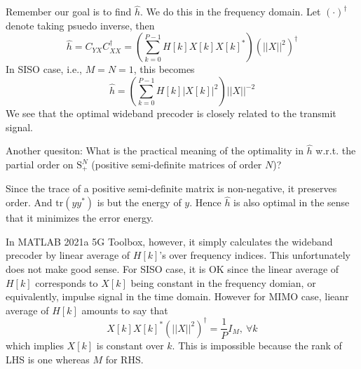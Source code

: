 \documentclass[12pt]{article}
\theoremstyle{definition}
\begin{document}
Remember our goal is to find $\hat{h}$. We do this in the frequency domain. Let $(\cdot )^{\dagger}$ denote taking psuedo inverse, then
$$\hat{h}=C_{YX}C_{XX}^{\dagger}=\left(\sum_{k=0}^{P-1}H[k]X[k]X[k]^* \right)\left(||X||^2 \right)^{\dagger}$$
In SISO case, i.e., $M=N=1$, this becomes
$$\hat{h}=\left(\sum_{k=0}^{P-1}H[k]|X[k]|^2 \right)||X||^{-2}$$
We see that the optimal wideband precoder is closely related to the transmit signal.

Another quesiton: What is the practical meaning of the optimality in $\hat{h}$ w.r.t. the partial order on $\mbox{S}_+^N$ (positive semi-definite matrices of order $N$)? 

Since the trace of a positive semi-definite matrix is non-negative, it preserves order. And $\mbox{tr}\left(yy^*\right)$ is but the energy of $y$. Hence $\hat{h}$ is also optimal in the sense that it minimizes the error energy.

In MATLAB 2021a 5G Toolbox, however, it simply calculates the wideband precoder by linear average of $H[k]$'s over frequency indices. This unfortunately does not make good sense. For SISO case, it is OK since the linear average of $H[k]$ corresponds to $X[k]$ being constant in the frequency domian, or equivalently, impulse signal in the time domain. However for MIMO case, lieanr average of $H[k]$ amounts to say that
$$X[k]X[k]^*\left(||X||^2 \right)^{\dagger}=\frac{1}{P}I_M,\ \forall k$$
which implies $X[k]$ is constant over $k$. This is impossible because the rank of LHS is one whereas $M$ for RHS.
\end{document}
